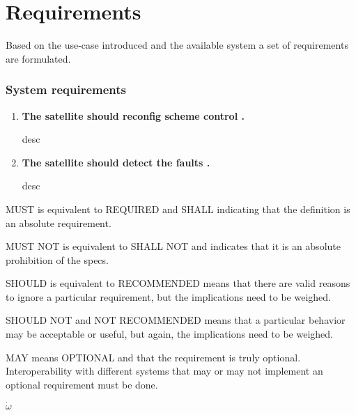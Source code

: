 \chapter{Requirements}\label{chap:requirements}
Based on the use-case introduced and the available system a set of requirements are formulated.
%
\subsection*{System requirements}
%
\begin{enumerate}
	\item \textbf{The satellite should reconfig scheme control .}
	
	desc
	
	\item \textbf{The satellite should detect the faults .}
	
	desc
	
\end{enumerate}

MUST is equivalent to REQUIRED and SHALL indicating that the definition is an absolute requirement.

MUST NOT is equivalent to SHALL NOT and indicates that it is an absolute prohibition of the specs.

SHOULD is equivalent to RECOMMENDED means that there are valid reasons to ignore a particular requirement, but the implications need to be weighed.

SHOULD NOT and NOT RECOMMENDED means that a particular behavior may be acceptable or useful, but again, the implications need to be weighed.

MAY means OPTIONAL and that the requirement is truly optional. Interoperability with different systems that may or may not implement an optional requirement must be done.

$\dot \omega $